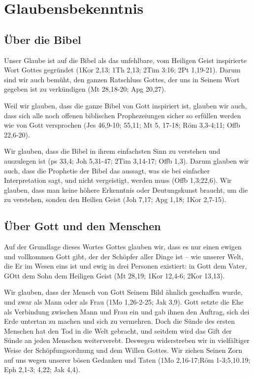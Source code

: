 \section{Glaubensbekenntnis}
\subsection{Über die Bibel}
Unser Glaube ist auf die Bibel als das unfehlbare, vom Heiligen Geist inspirierte Wort Gottes gegründet (1Kor 2,13; 1Th 2,13; 2Tim 3:16; 2Pt 1,19-21). Darum sind wir auch bemüht, den \glqq ganzen Ratschluss Gottes\grqq, der uns in Seinem Wort gegeben ist zu verkündigen (Mt 28,18-20; Apg 20,27).

Weil wir glauben, dass die ganze Bibel von Gott inspiriert ist, glauben wir auch, dass sich alle noch offenen biblischen Prophezeiungen sicher so erfüllen werden wie von Gott versprochen (Jes 46,9-10; 55,11; Mt 5, 17-18; Röm 3,3-4;11; Offb 22,6-20).

Wir glauben, dass die Bibel in ihrem einfachsten Sinn zu verstehen und auszulegen ist (ps 33,4; Joh 5,31-47; 2Tim 3,14-17; Offb 1,3). Darum glauben wir auch, dass die Prophetie der Bibel das aussagt, was sie bei einfacher Interpretation sagt, und nicht vergeistigt, werden muss (Offb 1,3;22,6). Wir glauben, dass man keine höhere Erkenntnis oder Deutungskunst braucht, um die zu verstehen, sonden den Heilien Geist (Joh 7,17; Apg 1,18; 1Kor 2,7-15).
\subsection{Über Gott und den Menschen}
Auf der Grundlage dieses Wortes Gottes glauben wir, dass es nur einen ewigen und vollkommen Gott gibt, der der Schöpfer aller Dinge ist -- wie unserer Welt, die Er im Wesen eins ist und ewig in drei Personen existiert: in Gott dem Vater, GOtt dem Sohn dem Heiligen Geist (Mt 28,19; 1Kor 12,4-6; 2Kor 13,13).

Wir glauben, dass der Mensch von Gott Seinem Bild ähnlich geschaffen wurde, und zwar als Mann oder als Frau (1Mo 1,26-2-25; Jak 3,9). Gott setzte die Ehe als Verbindung zwischen Mann und Frau ein und gab ihnen den Auftrag, sich dei Erde untertan zu machen und sich zu vermehren. Doch die Sünde des ersten Menschen hat den Tod in die Welt gebracht, und seitdem wird das Gift der Sünde an jeden Menschen weiterverebt. Deswegen widerstreben wir in vielfältiger Weise der Schöpfungsordnung und dem Willen Gottes. Wir ziehen Seinen Zorn auf uns wegen unserer bösen Gedanken und Taten (1Mo 2,16-17;Röm 1-3;5,10.19; Eph 2,1-3; 4,22; Jak 4,4).

